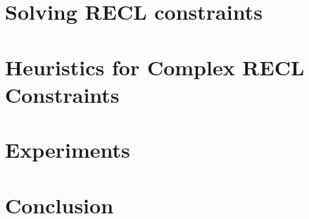 \documentclass[preprint,12pt]{elsarticle}
\begin{document}
\section{Solving RECL constraints} \label{sec:algorithm}


\section{Heuristics for Complex RECL Constraints} \label{sec:heuristic}


\section{Experiments} \label{sec:implementation}


\section{Conclusion} \label{sec:conclu}


\newpage




%
\end{document}
